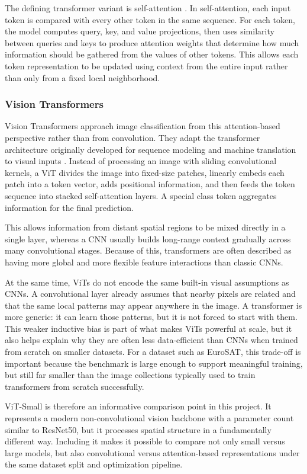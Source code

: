 \documentclass[11pt]{report}
\begin{document}
The defining transformer variant is self-attention \cite{vaswani2017}. In self-attention, each input token is compared with every other token in the same sequence. For each token, the model computes query, key, and value projections, then uses similarity between queries and keys to produce attention weights that determine how much information should be gathered from the values of other tokens. This allows each token representation to be updated using context from the entire input rather than only from a fixed local neighborhood.

\subsubsection{Vision Transformers}
Vision Transformers approach image classification from this attention-based perspective rather than from convolution. They adapt the transformer architecture originally developed for sequence modeling and machine translation \cite{vaswani2017} to visual inputs \cite{dosovitskiy2021}. Instead of processing an image with sliding convolutional kernels, a ViT divides the image into fixed-size patches, linearly embeds each patch into a token vector, adds positional information, and then feeds the token sequence into stacked self-attention layers. A special class token aggregates information for the final prediction.

This allows information from distant spatial regions to be mixed directly in a single layer, whereas a CNN usually builds long-range context gradually across many convolutional stages. Because of this, transformers are often described as having more global and more flexible feature interactions than classic CNNs.

At the same time, ViTs do not encode the same built-in visual assumptions as CNNs. A convolutional layer already assumes that nearby pixels are related and that the same local patterns may appear anywhere in the image. A transformer is more generic: it can learn those patterns, but it is not forced to start with them. This weaker inductive bias is part of what makes ViTs powerful at scale, but it also helps explain why they are often less data-efficient than CNNs when trained from scratch on smaller datasets. For a dataset such as EuroSAT, this trade-off is important because the benchmark is large enough to support meaningful training, but still far smaller than the image collections typically used to train transformers from scratch successfully.

ViT-Small is therefore an informative comparison point in this project. It represents a modern non-convolutional vision backbone with a parameter count similar to ResNet50, but it processes spatial structure in a fundamentally different way. Including it makes it possible to compare not only small versus large models, but also convolutional versus attention-based representations under the same dataset split and optimization pipeline.
\end{document}
